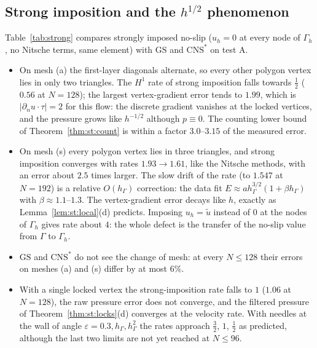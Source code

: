 \documentclass[pdflatex,sn-mathphys-num]{sn-jnl}
\theoremstyle{thmstyleone}
\theoremstyle{thmstylethree}
\newcommand{\hG}{h_\Gamma}
\newcommand{\Gh}{\Gamma_h}
\newcommand{\dn}{\partial_n}
\newcommand{\ut}{\tilde u}
\newcommand{\GS}{\mathrm{GS}}
\newcommand{\CNS}{\mathrm{CNS}^\ast}
\begin{document}
\subsection{Strong imposition and the \texorpdfstring{$h^{1/2}$}{h^(1/2)} phenomenon}\label{sec:num:strong}
Table~\ref{tab:strong} compares strongly imposed no-slip ($u_h=0$ at every node of $\Gh$, no Nitsche terms, same element) with $\GS$ and $\CNS$ on test A.
\begin{itemize}
\item On mesh (a) the first-layer diagonals alternate, so every other polygon vertex lies in only two triangles. The $H^1$ rate of strong imposition falls towards $\frac12$ ($0.56$ at $N=128$); the largest vertex-gradient error tends to $1.99$, which is $|\dn u\cdot\tau|=2$ for this flow: the discrete gradient vanishes at the locked vertices, and the pressure grows like $h^{-1/2}$ although $p\equiv0$. The counting lower bound of Theorem~\ref{thm:st:count} is within a factor $3.0$--$3.15$ of the measured error.
\item On mesh (s) every polygon vertex lies in three triangles, and strong imposition converges with rates $1.93\to1.61$, like the Nitsche methods, with an error about $2.5$ times larger. The slow drift of the rate (to $1.547$ at $N=192$) is a relative $O(\hG)$ correction: the data fit $E\approx a\hG^{3/2}(1+\beta\hG)$ with $\beta\approx1.1$--$1.3$. The vertex-gradient error decays like $h$, exactly as Lemma~\ref{lem:st:local}(d) predicts. Imposing $u_h=\ut$ instead of $0$ at the nodes of $\Gh$ gives rate about $4$: the whole defect is the transfer of the no-slip value from $\Gamma$ to $\Gh$.
\item $\GS$ and $\CNS$ do not see the change of mesh: at every $N\le128$ their errors on meshes (a) and (s) differ by at most $6\%$.
\item With a single locked vertex the strong-imposition rate falls to $1$ ($1.06$ at $N=128$), the raw pressure error does not converge, and the filtered pressure of Theorem~\ref{thm:st:locks}(d) converges at the velocity rate. With needles at the wall of angle $\varepsilon=0.3,\hG,\hG^2$ the rates approach $\frac32$, $1$, $\frac12$ as predicted, although the last two limits are not yet reached at $N\le96$.
\end{itemize}
\end{document}
